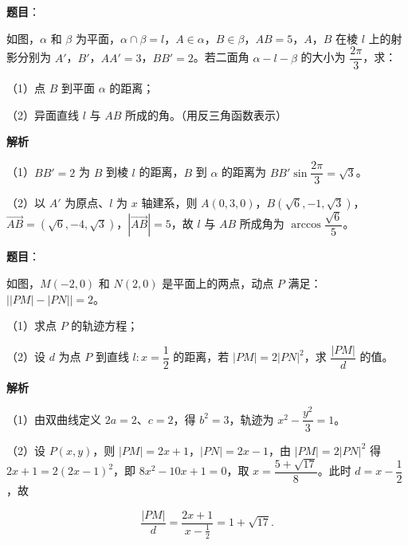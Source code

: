 \begin{answer}

\textbf{题目}：

如图，$\alpha$ 和 $\beta$ 为平面，$\alpha\cap\beta=l$，$A\in\alpha$，$B\in\beta$，$AB=5$，$A$，$B$ 在棱 $l$ 上的射影分别为 $A'$，$B'$，$AA'=3$，$BB'=2$。若二面角 $\alpha-l-\beta$ 的大小为 $\dfrac{2\pi}3$，求：

（1）点 $B$ 到平面 $\alpha$ 的距离；

（2）异面直线 $l$ 与 $AB$ 所成的角。（用反三角函数表示）
\nopagebreak[4]
\begin{center}\end{center}
\nopagebreak[4]
\textbf{解析}

（1）$BB'=2$ 为 $B$ 到棱 $l$ 的距离，$B$ 到 $\alpha$ 的距离为 $BB'\sin\dfrac{2\pi}3=\sqrt3$。

（2）以 $A'$ 为原点、$l$ 为 $x$ 轴建系，则 $A(0,3,0)$，$B(\sqrt6,-1,\sqrt3)$，$\overrightarrow{AB}=(\sqrt6,-4,\sqrt3)$，$|\overrightarrow{AB}|=5$，故 $l$ 与 $AB$ 所成角为 $\arccos\dfrac{\sqrt6}5$。


\end{answer}
\begin{answer}

\textbf{题目}：

如图，$M(-2,0)$ 和 $N(2,0)$ 是平面上的两点，动点 $P$ 满足：$\left||PM|-|PN|\right|=2$。

（1）求点 $P$ 的轨迹方程；

（2）设 $d$ 为点 $P$ 到直线 $l:x=\dfrac12$ 的距离，若 $|PM|=2|PN|^2$，求 $\dfrac{|PM|}d$ 的值。
\nopagebreak[4]
\begin{center}\end{center}
\nopagebreak[4]
\textbf{解析}

（1）由双曲线定义 $2a=2$、$c=2$，得 $b^2=3$，轨迹为 $x^2-\dfrac{y^2}3=1$。

（2）设 $P(x,y)$，则 $|PM|=2x+1$，$|PN|=2x-1$，由 $|PM|=2|PN|^2$ 得 $2x+1=2(2x-1)^2$，即 $8x^2-10x+1=0$，取 $x=\dfrac{5+\sqrt{17}}8$。此时 $d=x-\dfrac12$，故

\nopagebreak[4]
\[\frac{|PM|}d=\frac{2x+1}{x-\frac12}=1+\sqrt{17}.\]


\end{answer}
